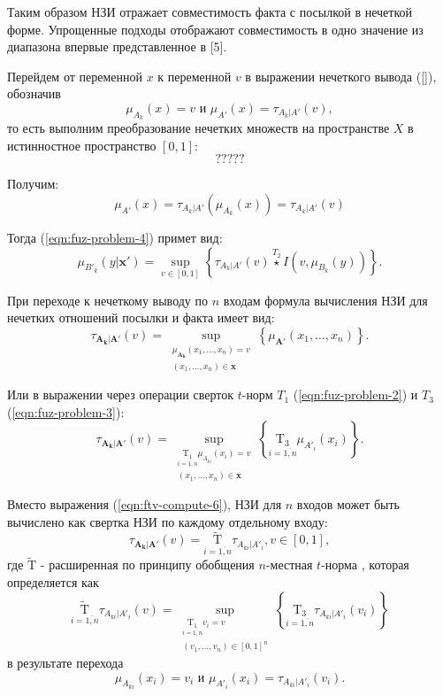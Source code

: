 Таким образом НЗИ отражает совместимость факта с посылкой в нечеткой форме. Упрощенные подходы отображают совместимость в одно значение из диапазона впервые представленное в [5].

Перейдем от переменной $x$ к переменной $v$ в выражении нечеткого вывода (\ref{}), обозначив
\[
\mu_{A_k}(x) = v \textrm{ и } \mu_{A'}(x) = \tau_{A_k|A'}(v),
\]
то есть выполним преобразование нечетких множеств на пространстве $X$ в истинностное пространство $[0, 1]$:
\[
?????
\]

Получим:
\begin{equation}
\label{eqn:ftv-compute-4}
\mu_{A'}(x) = \tau_{A_k|A'}(\mu_{A_k}(x)) = \tau_{A_k|A'}(v)
\end{equation}

Тогда (\ref{eqn:fuz-problem-4}) примет вид:
\begin{equation}
\label{eqn:ftv-compute-5}
\mu_{B'_k}(y|\mathbf{x'}) = \sup_{v \in [0,1]}\left\{\tau_{A_k|A'}(v) \overset{T_2}{\star} I(v, \mu_{B_k}(y))\right\}.
\end{equation}

При переходе к нечеткому выводу по $n$ входам формула вычисления НЗИ для нечетких отношений посылки и факта имеет вид:
\begin{equation*}
\tau_{\mathbf{A_k}|\mathbf{A'}}(v) = \sup_{\substack{\mu_{\mathbf{A_k}}(x_1, \dots, x_n) = v \\ (x_1, \dots, x_n) \in \mathbf{x}}} \left\{\mu_{\mathbf{A'}}(x_1, \dots, x_n)\right\} .
\end{equation*}

Или в выражении через операции сверток $t$-норм $T_1$ (\ref{eqn:fuz-problem-2}) и $T_3$ (\ref{eqn:fuz-problem-3}):
\begin{equation}
\label{eqn:ftv-compute-6}
\tau_{\mathbf{A_k}|\mathbf{A'}}(v) = \sup_{\substack{\underset{i=\overline{1,n}}{\mathrm{T_1}}\mu_{A_{ki}}(x_i)=v \\ (x_1, \dots, x_n) \in \mathbf{x}}} \left\{ \underset{i=\overline{1,n}}{\mathrm{T_3}} \mu_{A'_i}(x_i) \right\}.
\end{equation}

Вместо выражения (\ref{eqn:ftv-compute-6}), НЗИ для $n$ входов может быть вычислено как свертка НЗИ по каждому отдельному входу:
\begin{equation}
\label{eqn:ftv-compute-7}
\tau_{\mathbf{A_k}|\mathbf{A'}}(v) = \underset{i=\overline{1,n}}{\mathrm{\tilde{T}}} \tau_{A_{ki}|A'_i}, v \in [0, 1],
\end{equation}
где $\mathrm{\tilde{T}}$ - расширенная по принципу обобщения $n$-местная $t$-норма \cite{kutsenko2015methods}, которая определяется как
\begin{equation}
\underset{i=\overline{1,n}}{\mathrm{\tilde{T}}} \tau_{A_{ki}|A'_i}(v) = \sup_{\substack{\underset{i=\overline{1,n}}{\mathrm{T_1}}v_i = v \\ (v_1, \dots, v_n) \in [0, 1]^n}} \left\{\underset{i=\overline{1,n}}{\mathrm{T_3}}\tau_{A_{ki}|A'_i}(v_i)\right\}
\end{equation}
в результате перехода
\[
\mu_{A_{ki}}(x_i) = v_i \textrm{ и } \mu_{A'_i}(x_i) = \tau_{A_{ki}|A'_i}(v_i).
\]

